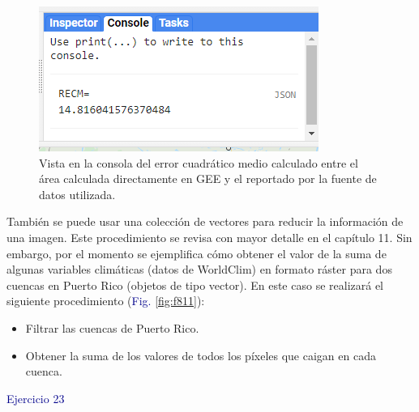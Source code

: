 \documentclass[
  12pt,
  letterpaper,
  twoside]{book}
\providecommand{\tightlist}{%
  \setlength{\itemsep}{0pt}\setlength{\parskip}{0pt}}
\begin{document}
\begin{figure}[H]

{\centering \includegraphics[width=0.95\linewidth]{Img/ej22} 

}

\caption{Vista en la consola del error cuadrático medio calculado entre el área calculada directamente en GEE y el reportado por la fuente de datos utilizada.}\label{fig:f810}
\end{figure}

También se puede usar una colección de vectores para reducir la información de una imagen. Este procedimiento se revisa con mayor detalle en el capítulo 11. Sin embargo, por el momento se ejemplifica cómo obtener el valor de la suma de algunas variables climáticas (datos de WorldClim) en formato ráster para dos cuencas en Puerto Rico (objetos de tipo vector). En este caso se realizará el siguiente procedimiento (\textcolor{darkblue}{Fig.} \ref{fig:f811}):

\begin{itemize}
\tightlist
\item
  Filtrar las cuencas de Puerto Rico.
\item
  Obtener la suma de los valores de todos los píxeles que caigan en cada cuenca.
\end{itemize}

\textcolor{darkblue}{Ejercicio 23}
\end{document}
